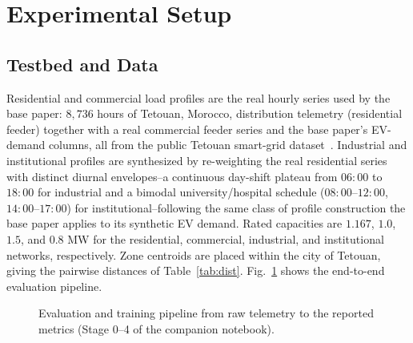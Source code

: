 \documentclass[10pt,journal]{IEEEtran}
\newcommand{\D}{\Delta}
\begin{document}
\section{Experimental Setup}\label{sec:setup}

\subsection{Testbed and Data}
Residential and commercial load profiles are the real hourly series used by
the base paper: $8{,}736$ hours of Tetouan, Morocco, distribution telemetry
(residential feeder) together with a real commercial feeder series and the
base paper's EV-demand columns, all from the public Tetouan smart-grid
dataset~\cite{salam2018}. Industrial and institutional profiles are
synthesized by re-weighting the real residential series with distinct
diurnal envelopes--a continuous day-shift plateau from $06{:}00$ to $18{:}00$
for industrial and a bimodal university/hospital schedule
($08{:}00$--$12{:}00$, $14{:}00$--$17{:}00$) for institutional--following
the same class of profile construction the base paper applies to its
synthetic EV demand. Rated capacities are $1.167$, $1.0$, $1.5$, and $0.8$
MW for the residential, commercial, industrial, and institutional networks,
respectively. Zone centroids are placed within the city of Tetouan, giving
the pairwise distances of Table~\ref{tab:dist}. Fig.~\ref{fig:pipeline}
shows the end-to-end evaluation pipeline.

\begin{figure}[!t]
\centering
{}
\caption{Evaluation and training pipeline from raw telemetry to the
reported metrics (Stage 0--4 of the companion notebook).}
\label{fig:pipeline}
\end{figure}
\end{document}
